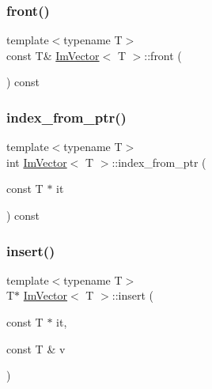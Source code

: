 \mbox{\label{structImVector_a67e0e856307bbd927e4253461d3772c7}} 
\subsubsection{\texorpdfstring{front()}{front()}\hspace{0.1cm}{\footnotesize\ttfamily [2/2]}}
{\footnotesize\ttfamily template$<$typename T$>$ \\
const T\& \hyperlink{structImVector}{Im\+Vector}$<$ T $>$\+::front (\begin{DoxyParamCaption}{ }\end{DoxyParamCaption}) const\hspace{0.3cm}{\ttfamily [inline]}}

\mbox{\label{structImVector_a3fd48379f807eeb01fb9da39afa30dc7}} 
\subsubsection{\texorpdfstring{index\+\_\+from\+\_\+ptr()}{index\_from\_ptr()}}
{\footnotesize\ttfamily template$<$typename T$>$ \\
int \hyperlink{structImVector}{Im\+Vector}$<$ T $>$\+::index\+\_\+from\+\_\+ptr (\begin{DoxyParamCaption}\item[{const T $\ast$}]{it }\end{DoxyParamCaption}) const\hspace{0.3cm}{\ttfamily [inline]}}

\mbox{\label{structImVector_a7859d07f4a90efd2d9fd9ad5c1bf43c6}} 
\subsubsection{\texorpdfstring{insert()}{insert()}}
{\footnotesize\ttfamily template$<$typename T$>$ \\
T$\ast$ \hyperlink{structImVector}{Im\+Vector}$<$ T $>$\+::insert (\begin{DoxyParamCaption}\item[{const T $\ast$}]{it,  }\item[{const T \&}]{v }\end{DoxyParamCaption})\hspace{0.3cm}{\ttfamily [inline]}}

